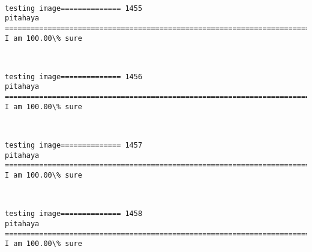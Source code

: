 \documentclass[11pt]{article}
\begin{document}
    \begin{center}
    \end{center}
    { \hspace*{\fill} \\}
    
    \begin{Verbatim}[commandchars=\\\{\}]
testing image============== 1455
pitahaya
============================================================================
I am 100.00\% sure

    \end{Verbatim}

    \begin{center}
    \end{center}
    { \hspace*{\fill} \\}
    
    \begin{Verbatim}[commandchars=\\\{\}]
testing image============== 1456
pitahaya
============================================================================
I am 100.00\% sure

    \end{Verbatim}

    \begin{center}
    \end{center}
    { \hspace*{\fill} \\}
    
    \begin{Verbatim}[commandchars=\\\{\}]
testing image============== 1457
pitahaya
============================================================================
I am 100.00\% sure

    \end{Verbatim}

    \begin{center}
    \end{center}
    { \hspace*{\fill} \\}
    
    \begin{Verbatim}[commandchars=\\\{\}]
testing image============== 1458
pitahaya
============================================================================
I am 100.00\% sure

    \end{Verbatim}
\end{document}
